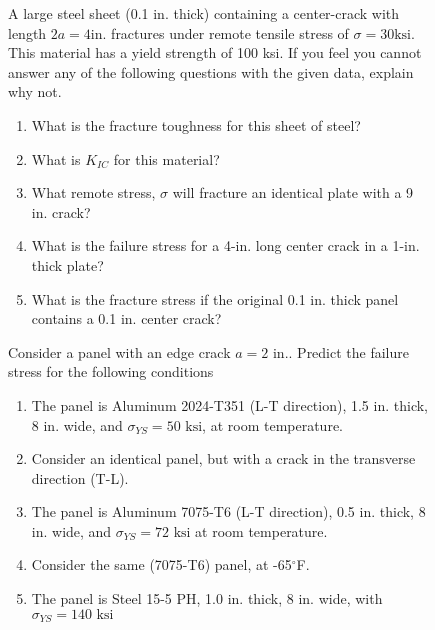 \documentclass[12pt, oneside]{article}
\begin{document}
\begin{enumerate}

\begin{figure}[H]
	\item A large steel sheet (0.1 in. thick) containing a center-crack with length $2a = 4 \text{in.}$ fractures under remote tensile stress of $\sigma = 30 \text{ksi}$. This material has a yield strength of 100 ksi. If you feel you cannot answer any of the following questions with the given data, explain why not.
	\begin{enumerate}
		\item What is the fracture toughness for this sheet of steel?
		\item What is $K_{IC}$ for this material?
		\item What remote stress, $\sigma$ will fracture an identical plate with a 9 in. crack?
		\item What is the failure stress for a 4-in. long center crack in a 1-in. thick plate?
		\item What is the fracture stress if the original 0.1 in. thick panel contains a 0.1 in. center crack?
	\end{enumerate}
\end{figure}

\begin{figure}[H]
	\item Consider a panel with an edge crack $a=2 \text{ in.}$. Predict the failure stress for the following conditions
	\begin{enumerate}
		\item The panel is Aluminum 2024-T351 (L-T direction), 1.5 in. thick, 8 in. wide, and $\sigma_{YS} = 50 \text{ ksi}$, at room temperature.
		\item Consider an identical panel, but with a crack in the transverse direction (T-L).
		\item The panel is Aluminum 7075-T6 (L-T direction), 0.5 in. thick, 8 in. wide, and $\sigma_{YS} = 72 \text{ ksi}$ at room temperature.
		\item Consider the same (7075-T6) panel, at -65$^\circ$F.
		\item The panel is Steel 15-5 PH, 1.0 in. thick, 8 in. wide, with $\sigma_{YS} = 140 \text{ ksi}$
	\end{enumerate}
\end{figure}


\end{enumerate}
\end{document}
